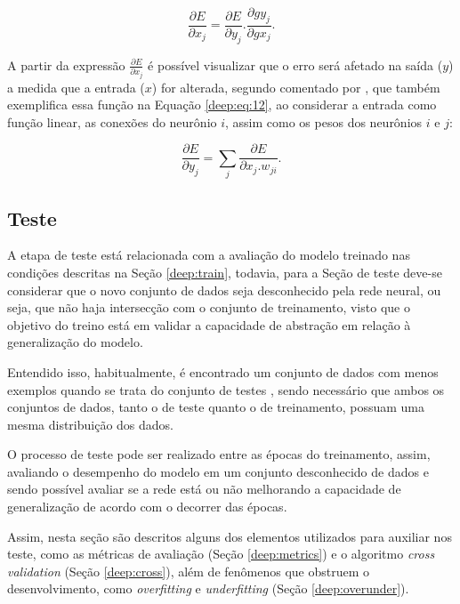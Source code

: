 \begin{equation}
    \label{deep:eq:11}
    \frac{\partial E}{\partial x_j} = \frac{\partial E}{\partial y_j} . \frac{\partial g y_j}{\partial g x_j}.
\end{equation}

A partir da expressão $\frac{\partial E}{\partial x_j}$ é possível visualizar que o erro será afetado na saída ($y$) a medida que a entrada ($x$) for alterada, segundo comentado por \cite{rumelhart1986learning}, que também exemplifica essa função na Equação \ref{deep:eq:12}, ao considerar a entrada como função linear, as conexões do neurônio $i$, assim como os pesos dos neurônios $i$ e $j$:

\begin{equation}
    \label{deep:eq:12}
    \frac{\partial E}{\partial y_j} = \sum_j \frac{\partial E}{\partial x_j . w_{ji}}.
\end{equation}


\subsection{Teste}
\label{deep:test}

A etapa de teste está relacionada com a avaliação do modelo treinado nas condições descritas na Seção \ref{deep:train}, todavia, para a Seção de teste deve-se considerar que o novo conjunto de dados seja desconhecido pela rede neural, ou seja, que não haja intersecção com o conjunto de treinamento, visto que o objetivo do treino está em validar a capacidade de abstração em relação à generalização do modelo.

Entendido isso, habitualmente, é encontrado um conjunto de dados com menos exemplos quando se trata do conjunto de testes \citep{Goodfellow2016}, sendo necessário que ambos os conjuntos de dados, tanto o de teste quanto o de treinamento, possuam uma mesma distribuição dos dados.

O processo de teste pode ser realizado entre as épocas do treinamento, assim, avaliando o desempenho do modelo em um conjunto desconhecido de dados e sendo possível avaliar se a rede está ou não melhorando a capacidade de generalização de acordo com o decorrer das épocas.

Assim, nesta seção são descritos alguns dos elementos utilizados para auxiliar nos teste, como as métricas de avaliação (Seção \ref{deep:metrics}) e o algoritmo \textit{cross validation} (Seção \ref{deep:cross}), além de fenômenos que obstruem o desenvolvimento, como \textit{overfitting} e \textit{underfitting} (Seção \ref{deep:overunder}).


